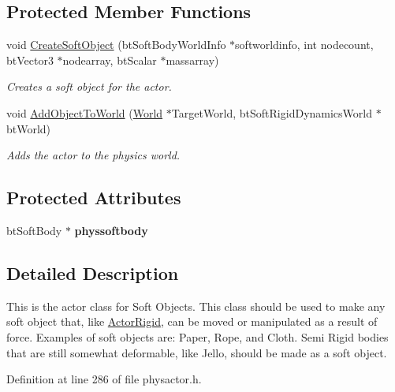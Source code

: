 \subsection*{Protected Member Functions}
\begin{DoxyCompactItemize}
\item 
void \hyperlink{classphys_1_1ActorSoft_a04c98bb0ab9ed7c1dfc3435d49403ef4}{CreateSoftObject} (btSoftBodyWorldInfo $\ast$softworldinfo, int nodecount, btVector3 $\ast$nodearray, btScalar $\ast$massarray)
\begin{DoxyCompactList}\small\item\em Creates a soft object for the actor. \item\end{DoxyCompactList}\item 
void \hyperlink{classphys_1_1ActorSoft_a3a704ab32f847a5d0e060f8a592efefd}{AddObjectToWorld} (\hyperlink{classphys_1_1World}{World} $\ast$TargetWorld, btSoftRigidDynamicsWorld $\ast$btWorld)
\begin{DoxyCompactList}\small\item\em Adds the actor to the physics world. \item\end{DoxyCompactList}\end{DoxyCompactItemize}
\subsection*{Protected Attributes}
\begin{DoxyCompactItemize}
\item 
\hypertarget{classphys_1_1ActorSoft_ab3b2c8e1f94dff3e3244a5024595afef}{
btSoftBody $\ast$ {\bfseries physsoftbody}}
\label{d4/d23/classphys_1_1ActorSoft_ab3b2c8e1f94dff3e3244a5024595afef}

\end{DoxyCompactItemize}


\subsection{Detailed Description}
This is the actor class for Soft Objects. This class should be used to make any soft object that, like \hyperlink{classphys_1_1ActorRigid}{ActorRigid}, can be moved or manipulated as a result of force. Examples of soft objects are: Paper, Rope, and Cloth. Semi Rigid bodies that are still somewhat deformable, like Jello, should be made as a soft object. 

Definition at line 286 of file physactor.h.



